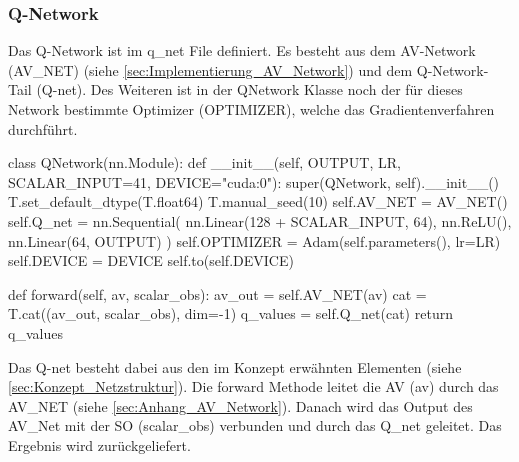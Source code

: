 \subsubsection{Q-Network} \label{sec:Implementierung_Q-Network}
Das Q-Network ist im q\_net File definiert.
Es besteht aus dem AV-Network (AV\_NET) (siehe \ref{sec:Implementierung_AV_Network}) und dem Q-Network-Tail (Q-net). Des Weiteren ist in der QNetwork Klasse noch der für dieses Network bestimmte Optimizer (OPTIMIZER), welche das Gradientenverfahren durchführt.
\begin{python}
	class QNetwork(nn.Module):
		def __init__(self, OUTPUT, LR, SCALAR_INPUT=41, DEVICE="cuda:0"):
			super(QNetwork, self).__init__()
			T.set_default_dtype(T.float64)
			T.manual_seed(10)
			self.AV_NET = AV_NET()
			self.Q_net = nn.Sequential(
				nn.Linear(128 + SCALAR_INPUT, 64),
				nn.ReLU(),
				nn.Linear(64, OUTPUT)
			)
			self.OPTIMIZER = Adam(self.parameters(), lr=LR)
			self.DEVICE = DEVICE
			self.to(self.DEVICE)
	
		def forward(self, av, scalar_obs):
			av_out = self.AV_NET(av)
			cat = T.cat((av_out, scalar_obs), dim=-1)
			q_values = self.Q_net(cat)
			return q_values
\end{python}
Das Q-net besteht dabei aus den im Konzept erwähnten Elementen (siehe \ref{sec:Konzept_Netzstruktur}).
Die forward Methode leitet die AV (av) durch das AV\_NET (siehe \ref{sec:Anhang_AV_Network}). Danach wird das Output des AV\_Net mit der SO (scalar\_obs) verbunden und durch das Q\_net geleitet. Das Ergebnis wird zurückgeliefert.

